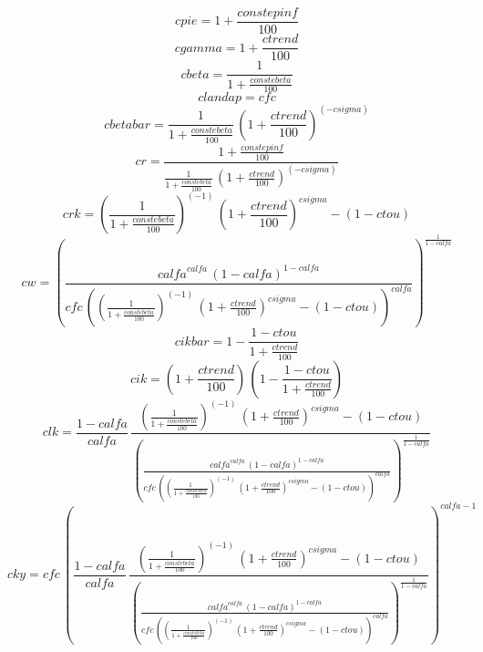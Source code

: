 \begin{dmath*}
cpie = 1+\frac{{constepinf}}{100}
\end{dmath*}
\begin{dmath*}
cgamma = 1+\frac{{ctrend}}{100}
\end{dmath*}
\begin{dmath*}
cbeta = \frac{1}{1+\frac{{constebeta}}{100}}
\end{dmath*}
\begin{dmath*}
clandap = {cfc}
\end{dmath*}
\begin{dmath*}
cbetabar = \frac{1}{1+\frac{{constebeta}}{100}}\, \left(1+\frac{{ctrend}}{100}\right)^{\left(-{csigma}\right)}
\end{dmath*}
\begin{dmath*}
cr = \frac{1+\frac{{constepinf}}{100}}{\frac{1}{1+\frac{{constebeta}}{100}}\, \left(1+\frac{{ctrend}}{100}\right)^{\left(-{csigma}\right)}}
\end{dmath*}
\begin{dmath*}
crk = \left(\frac{1}{1+\frac{{constebeta}}{100}}\right)^{\left(-1\right)}\, \left(1+\frac{{ctrend}}{100}\right)^{{csigma}}-\left(1-{ctou}\right)
\end{dmath*}
\begin{dmath*}
cw = \left(\frac{{calfa}^{{calfa}}\, \left(1-{calfa}\right)^{1-{calfa}}}{{cfc}\, \left(\left(\frac{1}{1+\frac{{constebeta}}{100}}\right)^{\left(-1\right)}\, \left(1+\frac{{ctrend}}{100}\right)^{{csigma}}-\left(1-{ctou}\right)\right)^{{calfa}}}\right)^{\frac{1}{1-{calfa}}}
\end{dmath*}
\begin{dmath*}
cikbar = 1-\frac{1-{ctou}}{1+\frac{{ctrend}}{100}}
\end{dmath*}
\begin{dmath*}
cik = \left(1+\frac{{ctrend}}{100}\right)\, \left(1-\frac{1-{ctou}}{1+\frac{{ctrend}}{100}}\right)
\end{dmath*}
\begin{dmath*}
clk = \frac{1-{calfa}}{{calfa}}\, \frac{\left(\frac{1}{1+\frac{{constebeta}}{100}}\right)^{\left(-1\right)}\, \left(1+\frac{{ctrend}}{100}\right)^{{csigma}}-\left(1-{ctou}\right)}{\left(\frac{{calfa}^{{calfa}}\, \left(1-{calfa}\right)^{1-{calfa}}}{{cfc}\, \left(\left(\frac{1}{1+\frac{{constebeta}}{100}}\right)^{\left(-1\right)}\, \left(1+\frac{{ctrend}}{100}\right)^{{csigma}}-\left(1-{ctou}\right)\right)^{{calfa}}}\right)^{\frac{1}{1-{calfa}}}}
\end{dmath*}
\begin{dmath*}
cky = {cfc}\, \left(\frac{1-{calfa}}{{calfa}}\, \frac{\left(\frac{1}{1+\frac{{constebeta}}{100}}\right)^{\left(-1\right)}\, \left(1+\frac{{ctrend}}{100}\right)^{{csigma}}-\left(1-{ctou}\right)}{\left(\frac{{calfa}^{{calfa}}\, \left(1-{calfa}\right)^{1-{calfa}}}{{cfc}\, \left(\left(\frac{1}{1+\frac{{constebeta}}{100}}\right)^{\left(-1\right)}\, \left(1+\frac{{ctrend}}{100}\right)^{{csigma}}-\left(1-{ctou}\right)\right)^{{calfa}}}\right)^{\frac{1}{1-{calfa}}}}\right)^{{calfa}-1}
\end{dmath*}
